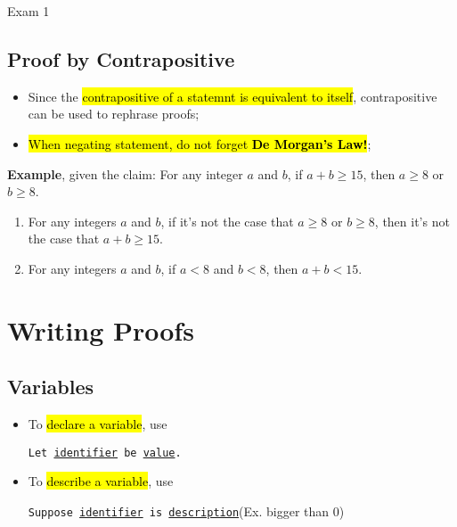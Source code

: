 \documentclass{note}
\begin{document}
\begin{note}{Exam 1}
        \subsection{Proof by Contrapositive}

        \begin{itemize}
            \item Since the \hl{contrapositive of a statemnt is equivalent to itself}, contrapositive
            can be used to rephrase proofs;
            \item \hl{When negating statement, do not forget \textbf{De Morgan's Law!}};
        \end{itemize}

        \textbf{Example}, given the claim: For any integer $ a $ and $ b $, if  $ a+b \geq 15 $, then $ a \geq 8 $ or $ b \geq 8 $.
        \begin{enumerate}
            \item For any integers $ a $ and $ b $, if it’s not the case that  $ a \geq 8 $ or $ b \geq 8 $,
            then it’s not the case that $ a + b \geq 15 $.
            \item For any integers $ a $ and $ b $, if $ a < 8 $ and $ b < 8 $, then $ a + b < 15 $.
        \end{enumerate}

        \section{Writing Proofs}

        \subsection{Variables}

        \begin{itemize}
            \item To \hl{declare a variable}, use
            \begin{center}
                \texttt{Let \ul{identifier} be \ul{value}.}
            \end{center}

            \item To \hl{describe a variable}, use
            \begin{center}
                \texttt{Suppose \ul{identifier} is \ul{description}}(Ex. bigger than 0)
            \end{center}
        \end{itemize}

    \end{note}
\end{document}
